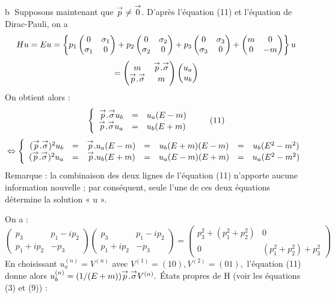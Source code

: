 \textcircled{b} Supposons maintenant que ${\overset{\rightarrow}{p}}\neq{\overset{\rightarrow}{0}}$.
D’après l’équation (11) et l’équation de Dirac-Pauli, on a
\[
Hu=Eu=\left\{p_1
\begin{pmatrix} 0 & \sigma_1 \\ \sigma_1 & 0 \end{pmatrix}+p_2
\begin{pmatrix} 0 & \sigma_2 \\ \sigma_2 & 0 \end{pmatrix}+p_3
\begin{pmatrix} 0 & \sigma_3 \\ \sigma_3 & 0\end{pmatrix} +
\begin{pmatrix} m & 0 \\ 0 & -m \end{pmatrix} \right\}u
\]
\[
=\begin{pmatrix} m & {\overset{\rightarrow}{p}}.{\overset{\rightarrow}{\sigma}} \\ {\overset{\rightarrow}{p}}.{\overset{\rightarrow}{\sigma}} & m \end{pmatrix}
\begin{pmatrix} u_a \\ u_b \end{pmatrix}
\]
On obtient alors :
\[\left\{
\begin{array}{ r c l }
{\overset{\rightarrow}{p}}.{\overset{\rightarrow}{\sigma}}u_b&=&u_a(E-m)\\
{\overset{\rightarrow}{p}}.{\overset{\rightarrow}{\sigma}}u_a&=&u_b(E+m)\\
\end{array}\right.\tag{11}
\]
\[\Leftrightarrow\left\{
\begin{array}{rccccccl}
({\overset{\rightarrow}{p}}.{\overset{\rightarrow}{\sigma}})^2u_b&=&{\overset{\rightarrow}{p}}.u_a(E-m)&=&u_b(E+m)(E-m)&=&u_b(E^2-m^2)\\
({\overset{\rightarrow}{p}}.{\overset{\rightarrow}{\sigma}})^2u_a&=&{\overset{\rightarrow}{p}}.u_b(E+m)&=&u_a(E-m)(E+m)&=&u_a(E^2-m^2)\\
\end{array}\right.
\]
Remarque : la combinaison des deux lignes de l’équation (11) n’apporte aucune
information nouvelle ; par conséquent, seule l’une de ces deux équations
détermine la solution « u ».

On a :
\[
\begin{pmatrix} p_3 & p_1-ip_2 \\ p_1+ip_2 & -p_3 \end{pmatrix}
\begin{pmatrix} p_3 & p_1-ip_2 \\ p_1+ip_2 & -p_3 \end{pmatrix}=
\begin{pmatrix} p_3^2+(p_1^2+p_2^2) & 0 \\
0 & (p_1^2+p_2^2)+p_3^2 \end{pmatrix}
\]
En choisissant $u_a^{(n)}=V^{(n)}$ avec $V^{(1)}=(1 0),V^{(2)}=(0 1),$
l’équation (11) donne alors $u_b^{(n)}=(1/(E+m)){\overset{\rightarrow}{p}}.{\overset{\rightarrow}{\sigma}}V^{(n)}.$
États propres de H (voir les équations (3) et (9)) :

